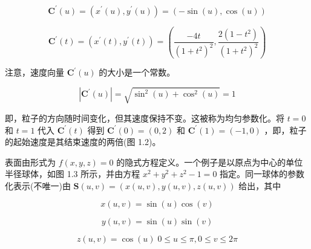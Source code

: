 \documentclass[../main.tex]{subfiles}
\begin{document}
\[
{\mathbf{C}}^{\prime }\left( u\right)  = \left( {{x}^{\prime }\left( u\right) ,{y}^{\prime }\left( u\right) }\right)  = \left( {-\sin \left( u\right) ,\cos \left( u\right) }\right)
\]

\[
{\mathbf{C}}^{\prime }\left( t\right)  = \left( {{x}^{\prime }\left( t\right) ,{y}^{\prime }\left( t\right) }\right)  = \left( {\frac{-{4t}}{{\left( 1 + {t}^{2}\right) }^{2}},\frac{2\left( {1 - {t}^{2}}\right) }{{\left( 1 + {t}^{2}\right) }^{2}}}\right)
\]

注意，速度向量 \({\mathbf{C}}^{\prime }\left( u\right)\) 的大小是一个常数。

\[
\left| {{\mathbf{C}}^{\prime }\left( u\right) }\right|  = \sqrt{{\sin }^{2}\left( u\right)  + {\cos }^{2}\left( u\right) } = 1
\]

即，粒子的方向随时间变化，但其速度保持不变。这被称为均匀参数化。将 \(t = 0\) 和 \(t = 1\) 代入 \({\mathbf{C}}^{\prime }\left( t\right)\) 得到 \({\mathbf{C}}^{\prime }\left( 0\right)  = \left( {0,2}\right)\) 和 \({\mathbf{C}}^{\prime }\left( 1\right)  = \left( {-1,0}\right)\) ，即，粒子的起始速度是其结束速度的两倍(图 1.2)。

\begin{center}\begin{minipage}{12cm}
    \centering
    \label{fig:unit_circle_velocity}
\end{minipage}\end{center}

表面由形式为 \(f\left( {x,y,z}\right)  = 0\) 的隐式方程定义。一个例子是以原点为中心的单位半径球体，如图 1.3 所示，并由方程 \({x}^{2} + {y}^{2} + {z}^{2} - 1 = 0\) 指定。同一球体的参数化表示(不唯一)由 \(\mathbf{S}\left( {u,v}\right)  = \left( {x\left( {u,v}\right) ,y\left( {u,v}\right) ,z\left( {u,v}\right) }\right)\) 给出，其中

\[
x\left( {u,v}\right)  = \sin \left( u\right) \cos \left( v\right)
\]

\[
y\left( {u,v}\right)  = \sin \left( u\right) \sin \left( v\right)
\]

\[
z\left( {u,v}\right)  = \cos \left( u\right) \;0 \leq  u \leq  \pi ,0 \leq  v \leq  {2\pi } \tag{1.3}
\]

\end{document}
